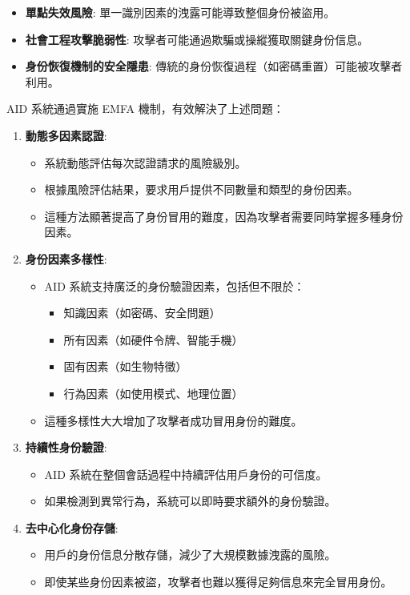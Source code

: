 \begin{itemize}
  \item \textbf{單點失效風險}: 單一識別因素的洩露可能導致整個身份被盜用。
  \item \textbf{社會工程攻擊脆弱性}: 攻擊者可能通過欺騙或操縱獲取關鍵身份信息。
  \item \textbf{身份恢復機制的安全隱患}: 傳統的身份恢復過程（如密碼重置）可能被攻擊者利用。
\end{itemize}

AID 系統通過實施 EMFA 機制，有效解決了上述問題：

\begin{enumerate}
  \item \textbf{動態多因素認證}:
        \begin{itemize}
          \item 系統動態評估每次認證請求的風險級別。
          \item 根據風險評估結果，要求用戶提供不同數量和類型的身份因素。
          \item 這種方法顯著提高了身份冒用的難度，因為攻擊者需要同時掌握多種身份因素。
        \end{itemize}

  \item \textbf{身份因素多樣性}:
        \begin{itemize}
          \item AID 系統支持廣泛的身份驗證因素，包括但不限於：
                \begin{itemize}
                  \item 知識因素（如密碼、安全問題）
                  \item 所有因素（如硬件令牌、智能手機）
                  \item 固有因素（如生物特徵）
                  \item 行為因素（如使用模式、地理位置）
                \end{itemize}
          \item 這種多樣性大大增加了攻擊者成功冒用身份的難度。
        \end{itemize}

  \item \textbf{持續性身份驗證}:
        \begin{itemize}
          \item AID 系統在整個會話過程中持續評估用戶身份的可信度。
          \item 如果檢測到異常行為，系統可以即時要求額外的身份驗證。
        \end{itemize}

  \item \textbf{去中心化身份存儲}:
        \begin{itemize}
          \item 用戶的身份信息分散存儲，減少了大規模數據洩露的風險。
          \item 即使某些身份因素被盜，攻擊者也難以獲得足夠信息來完全冒用身份。
        \end{itemize}
\end{enumerate}

